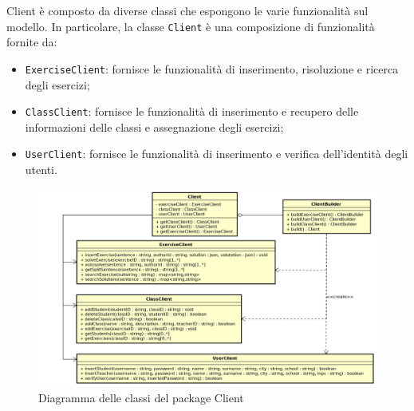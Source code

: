 Client è composto da diverse classi che espongono le varie funzionalità sul modello. In particolare, la classe \texttt{Client} è una composizione di funzionalità fornite da:
\begin{itemize}
	\item \texttt{ExerciseClient}: fornisce le funzionalità di inserimento, risoluzione e ricerca degli esercizi;
	\item \texttt{ClassClient}: fornisce le funzionalità di inserimento e recupero delle informazioni delle classi e assegnazione degli esercizi;
	\item \texttt{UserClient}: fornisce le funzionalità di inserimento e verifica dell'identità degli utenti.
\end{itemize}

\begin{figure}[ht]
	\includegraphics[scale=0.5]{images/Client.png}
	\caption{Diagramma delle classi del package Client}
\end{figure}